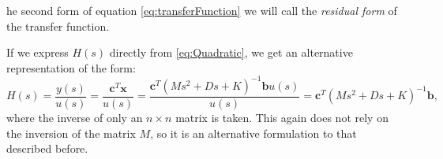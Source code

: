 \documentclass{article}
\begin{document}
	he second form of equation \ref{eq:transferFunction} we will call the \emph{residual form} of the transfer function.
	
	If we express $H(s)$ directly from \autoref{eq:Quadratic}, we get an alternative representation of the form:
	\begin{equation}
		H(s) = \frac{y(s)}{u(s)} = \frac{\textbf{c}^T \textbf{x}}{u(s)}
		= \frac{\textbf{c}^T \left(M s^2 + D s + K\right)^{-1} \textbf{b}u(s)}{u(s)} = \textbf{c}^T \left(M s^2 + D s + K\right)^{-1} \textbf{b},
	\end{equation}
	where the inverse of only an $n \times n$ matrix is taken. This again does not rely on the inversion of the matrix $M$, so it is an alternative formulation to that described before.
	
\end{document}
